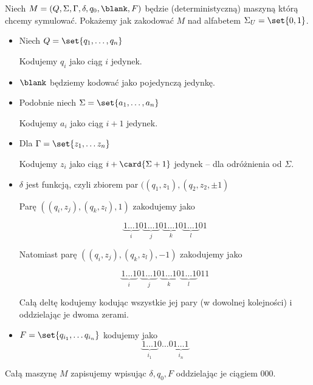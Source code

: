 Niech \( M = (Q, \Sigma, \Gamma, \delta, q_0, \blank, F) \) będzie (deterministyczną) maszyną którą chcemy symulować. Pokażemy jak zakodować \( M \) nad alfabetem \( \Sigma_U = \set{0, 1} \).

\begin{itemize}
    \item Niech \( Q = \set{q_1, \dots, q_n} \)
    
    Kodujemy \( q_i \) jako ciąg \( i \) jedynek.
    
    \item \( \blank \) będziemy kodować jako pojedynczą jedynkę.
    
    
    \item Podobnie niech \( \Sigma = \set{a_1, \dots, a_n} \)
    
    Kodujemy \( a_i \) jako ciąg \( i + 1 \) jedynek.
    
    \item Dla \( \Gamma = \set{z_1, \dots z_n} \)
    
    Kodujemy \( z_i \) jako ciąg \( i + \card{\Sigma + 1} \) jedynek -- dla odróżnienia od \( \Sigma \).
    
    \item \( \delta \) jest funkcją, czyli zbiorem par \( ((q_1, z_1), (q_2, z_2, \pm 1) \)
    
    Parę \( ((q_i, z_j), (q_k, z_l), 1) \) zakodujemy jako
    
    \[
        \underbrace{1 \dots 1}_i
        0
        \underbrace{1 \dots 1}_j
        0
        \underbrace{1 \dots 1}_k
        0
        \underbrace{1 \dots 1}_l
        0
        1
    \]
    
    Natomiast parę \( ((q_i, z_j), (q_k, z_l), -1) \) zakodujemy jako
    
    \[
        \underbrace{1 \dots 1}_i
        0
        \underbrace{1 \dots 1}_j
        0
        \underbrace{1 \dots 1}_k
        0
        \underbrace{1 \dots 1}_l
        0
        11
    \]
    
    Całą deltę kodujemy kodując wszystkie jej pary (w dowolnej kolejności) i oddzielając je dwoma zerami.
    
    \item \( F = \set{q_{i_1}, \dots q_{i_n}} \) kodujemy jako
    \[
        \underbrace{1 \dots 1}_{i_1} 0 \dots 0 \underbrace{1 \dots 1}_{i_n}
    \]
\end{itemize}

Całą maszynę \( M \) zapisujemy wpisując \( \delta, q_0, F \) oddzielając je ciągiem \( 000 \).

